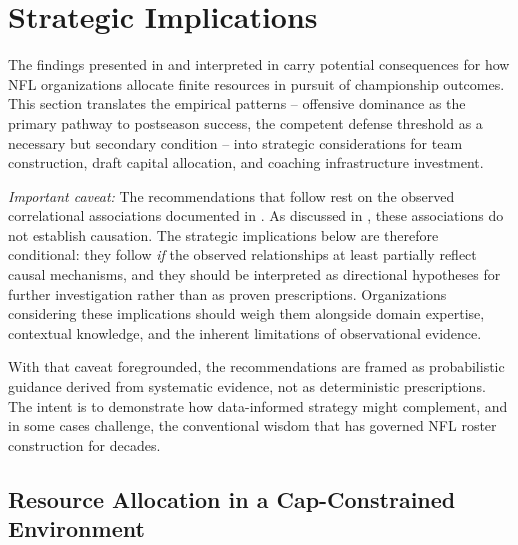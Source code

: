 \section{Strategic Implications}
\label{sec:implications}

The findings presented in  and interpreted in
 carry potential consequences for how NFL organizations
allocate finite resources in pursuit of championship outcomes. This
section translates the empirical patterns -- offensive dominance as the primary
pathway to postseason success, the competent defense threshold as a necessary
but secondary condition -- into strategic considerations for team
construction, draft capital allocation, and coaching infrastructure investment.

\emph{Important caveat:} The recommendations that follow rest on the observed
correlational associations documented in . As discussed in
, these associations do not establish causation.
The strategic implications below are therefore conditional: they follow
\emph{if} the observed relationships at least partially reflect causal
mechanisms, and they should be interpreted as directional hypotheses for
further investigation rather than as proven prescriptions. Organizations
considering these implications should weigh them alongside domain expertise,
contextual knowledge, and the inherent limitations of observational evidence.

With that caveat foregrounded, the recommendations are framed as probabilistic
guidance derived from systematic evidence, not as deterministic prescriptions.
The intent is to demonstrate how data-informed strategy might complement, and
in some cases challenge, the conventional wisdom that has governed NFL roster
construction for decades.

\subsection{Resource Allocation in a Cap-Constrained Environment}
\label{sec:resource-allocation}

